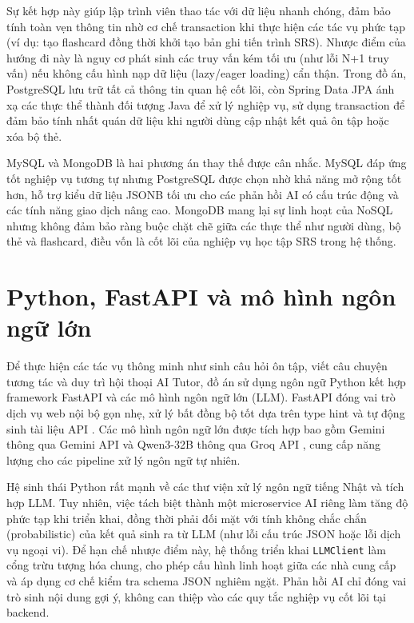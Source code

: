 \documentclass[../DoAn.tex]{subfiles}
\begin{document}
Sự kết hợp này giúp lập trình viên thao tác với dữ liệu nhanh chóng, đảm bảo tính toàn vẹn thông tin nhờ cơ chế transaction khi thực hiện các tác vụ phức tạp (ví dụ: tạo flashcard đồng thời khởi tạo bản ghi tiến trình SRS). Nhược điểm của hướng đi này là nguy cơ phát sinh các truy vấn kém tối ưu (như lỗi N+1 truy vấn) nếu không cấu hình nạp dữ liệu (lazy/eager loading) cẩn thận. Trong đồ án, PostgreSQL lưu trữ tất cả thông tin quan hệ cốt lõi, còn Spring Data JPA ánh xạ các thực thể thành đối tượng Java để xử lý nghiệp vụ, sử dụng transaction để đảm bảo tính nhất quán dữ liệu khi người dùng cập nhật kết quả ôn tập hoặc xóa bộ thẻ.

MySQL và MongoDB là hai phương án thay thế được cân nhắc. MySQL đáp ứng tốt nghiệp vụ tương tự nhưng PostgreSQL được chọn nhờ khả năng mở rộng tốt hơn, hỗ trợ kiểu dữ liệu JSONB tối ưu cho các phản hồi AI có cấu trúc động và các tính năng giao dịch nâng cao. MongoDB mang lại sự linh hoạt của NoSQL nhưng không đảm bảo ràng buộc chặt chẽ giữa các thực thể như người dùng, bộ thẻ và flashcard, điều vốn là cốt lõi của nghiệp vụ học tập SRS trong hệ thống.

\section{Python, FastAPI và mô hình ngôn ngữ lớn}
\label{section:3.4}

Để thực hiện các tác vụ thông minh như sinh câu hỏi ôn tập, viết câu chuyện tương tác và duy trì hội thoại AI Tutor, đồ án sử dụng ngôn ngữ Python kết hợp framework FastAPI và các mô hình ngôn ngữ lớn (LLM). FastAPI đóng vai trò dịch vụ web nội bộ gọn nhẹ, xử lý bất đồng bộ tốt dựa trên type hint và tự động sinh tài liệu API \cite{fastapi-docs}. Các mô hình ngôn ngữ lớn được tích hợp bao gồm Gemini thông qua Gemini API \cite{gemini-api-docs} và Qwen3-32B thông qua Groq API \cite{yang2025qwen3}, cung cấp năng lượng cho các pipeline xử lý ngôn ngữ tự nhiên.

Hệ sinh thái Python rất mạnh về các thư viện xử lý ngôn ngữ tiếng Nhật và tích hợp LLM. Tuy nhiên, việc tách biệt thành một microservice AI riêng làm tăng độ phức tạp khi triển khai, đồng thời phải đối mặt với tính không chắc chắn (probabilistic) của kết quả sinh ra từ LLM (như lỗi cấu trúc JSON hoặc lỗi dịch vụ ngoại vi). Để hạn chế nhược điểm này, hệ thống triển khai \texttt{LLMClient} làm cổng trừu tượng hóa chung, cho phép cấu hình linh hoạt giữa các nhà cung cấp và áp dụng cơ chế kiểm tra schema JSON nghiêm ngặt. Phản hồi AI chỉ đóng vai trò sinh nội dung gợi ý, không can thiệp vào các quy tắc nghiệp vụ cốt lõi tại backend.
\end{document}
